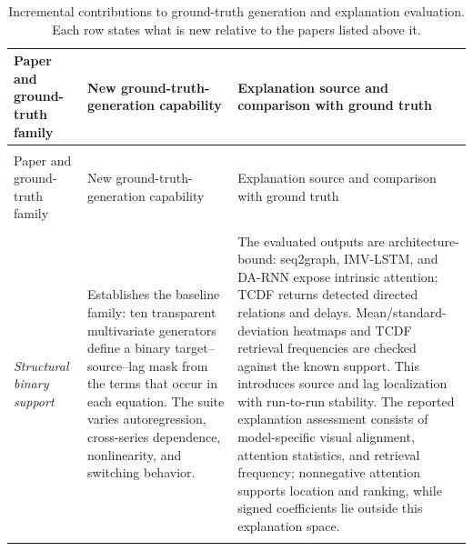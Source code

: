 \begingroup
\footnotesize
\setlength{\LTpre}{0.5\baselineskip}
\setlength{\LTpost}{0.5\baselineskip}
\renewcommand{\arraystretch}{1.08}
\begin{longtable}{@{}
>{\raggedright\arraybackslash}p{}
>{\raggedright\arraybackslash}p{}
>{\raggedright\arraybackslash}p{}@{}}
\caption{Incremental contributions to ground-truth generation and explanation
evaluation. Each row states what is new relative to the papers listed above it.}
\label{tab:incremental-gt-contributions}\\
\toprule
Paper and ground-truth family &
New ground-truth-generation capability &
Explanation source and comparison with ground truth \\
\midrule
\endfirsthead

\multicolumn{3}{@{}l}{\small\emph{Table~\thetable\ continued}}\\
\toprule
Paper and ground-truth family &
New ground-truth-generation capability &
Explanation source and comparison with ground truth \\
\midrule
\endhead

\midrule
\multicolumn{3}{r@{}}{\small\emph{Continued on the next page}}\\
\endfoot

\bottomrule
\endlastfoot

\citet{baric2021benchmarking}

\emph{Structural binary support} &
Establishes the baseline family: ten transparent multivariate generators define
a binary target--source--lag mask from the terms that occur in each equation.
The suite varies autoregression, cross-series dependence, nonlinearity, and
switching behavior. &
The evaluated outputs are architecture-bound: seq2graph, IMV-LSTM, and DA-RNN
expose intrinsic attention; TCDF returns detected directed relations and delays.
Mean/standard-deviation heatmaps and TCDF retrieval frequencies are checked
against the known support. This introduces source and lag localization with
run-to-run stability. The reported explanation assessment consists of
model-specific visual alignment, attention statistics, and retrieval frequency;
nonnegative attention supports location and ranking, while signed coefficients
lie outside this explanation space. \\
\addlinespace

\citet{almaghrabi2024multidimensional}


\end{longtable}
